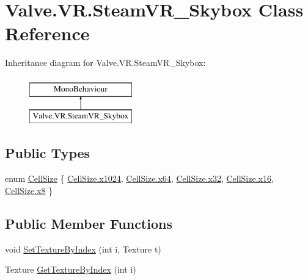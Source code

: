 \hypertarget{class_valve_1_1_v_r_1_1_steam_v_r___skybox}{}\section{Valve.\+V\+R.\+Steam\+V\+R\+\_\+\+Skybox Class Reference}
\label{class_valve_1_1_v_r_1_1_steam_v_r___skybox}
Inheritance diagram for Valve.\+V\+R.\+Steam\+V\+R\+\_\+\+Skybox\+:\begin{figure}[H]
\begin{center}
\leavevmode
\includegraphics[height=2.000000cm]{class_valve_1_1_v_r_1_1_steam_v_r___skybox}
\end{center}
\end{figure}
\subsection*{Public Types}
\begin{DoxyCompactItemize}
\item 
enum \mbox{\hyperlink{class_valve_1_1_v_r_1_1_steam_v_r___skybox_ad000cf5b884042065bb7e3bc5bdba27a}{Cell\+Size}} \{ \newline
\mbox{\hyperlink{class_valve_1_1_v_r_1_1_steam_v_r___skybox_ad000cf5b884042065bb7e3bc5bdba27aac67a3614a0c1272cf1d63d13534b6b3a}{Cell\+Size.\+x1024}}, 
\mbox{\hyperlink{class_valve_1_1_v_r_1_1_steam_v_r___skybox_ad000cf5b884042065bb7e3bc5bdba27aa9c16d991c79c6330e655aa29ea623492}{Cell\+Size.\+x64}}, 
\mbox{\hyperlink{class_valve_1_1_v_r_1_1_steam_v_r___skybox_ad000cf5b884042065bb7e3bc5bdba27aa4f3143a9df778e1295ff581a6e7f1c1b}{Cell\+Size.\+x32}}, 
\mbox{\hyperlink{class_valve_1_1_v_r_1_1_steam_v_r___skybox_ad000cf5b884042065bb7e3bc5bdba27aa5ac34987813226c2b2fbf4e027ca93b5}{Cell\+Size.\+x16}}, 
\newline
\mbox{\hyperlink{class_valve_1_1_v_r_1_1_steam_v_r___skybox_ad000cf5b884042065bb7e3bc5bdba27aaf2eebf3df8eb7d5db757de1c2d00d74d}{Cell\+Size.\+x8}}
 \}
\end{DoxyCompactItemize}
\subsection*{Public Member Functions}
\begin{DoxyCompactItemize}
\item 
void \mbox{\hyperlink{class_valve_1_1_v_r_1_1_steam_v_r___skybox_a541669a701c468fbe370c06f5b7b553a}{Set\+Texture\+By\+Index}} (int i, Texture t)
\item 
Texture \mbox{\hyperlink{class_valve_1_1_v_r_1_1_steam_v_r___skybox_a19f5a92d5d3c89886dab28a77b650410}{Get\+Texture\+By\+Index}} (int i)
\end{DoxyCompactItemize}
